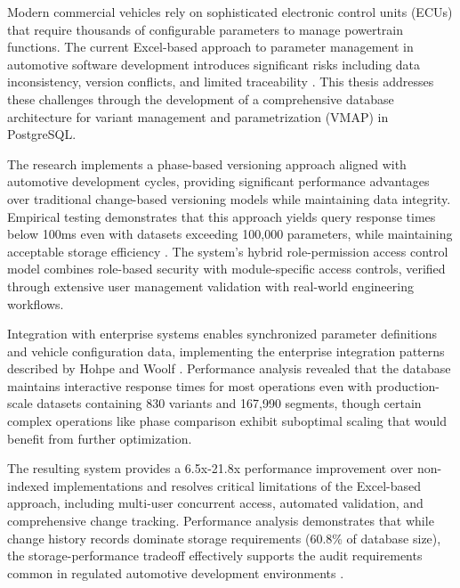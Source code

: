 Modern commercial vehicles rely on sophisticated electronic control units (ECUs) that require thousands of configurable parameters to manage powertrain functions. The current Excel-based approach to parameter management in automotive software development introduces significant risks including data inconsistency, version conflicts, and limited traceability \cite{trovao2024evolution}. This thesis addresses these challenges through the development of a comprehensive database architecture for variant management and parametrization (VMAP) in PostgreSQL. 
	
The research implements a phase-based versioning approach aligned with automotive development cycles, providing significant performance advantages over traditional change-based versioning models while maintaining data integrity. Empirical testing demonstrates that this approach yields query response times below 100ms even with datasets exceeding 100,000 parameters, while maintaining acceptable storage efficiency \cite{bhattacherjee2015principles}. The system's hybrid role-permission access control model combines role-based security with module-specific access controls, verified through extensive user management validation with real-world engineering workflows.
	
Integration with enterprise systems enables synchronized parameter definitions and vehicle configuration data, implementing the enterprise integration patterns described by Hohpe and Woolf \cite{hohpe2002enterprise}. Performance analysis revealed that the database maintains interactive response times for most operations even with production-scale datasets containing 830 variants and 167,990 segments, though certain complex operations like phase comparison exhibit suboptimal scaling that would benefit from further optimization.
	
The resulting system provides a 6.5x-21.8x performance improvement over non-indexed implementations and resolves critical limitations of the Excel-based approach, including multi-user concurrent access, automated validation, and comprehensive change tracking. Performance analysis demonstrates that while change history records dominate storage requirements (60.8\% of database size), the storage-performance tradeoff effectively supports the audit requirements common in regulated automotive development environments \cite{staron2021automotive}.












\newpage
\makeatletter
	\if@twoside%
   		\cleardoublepage
   		
	\else%
	\fi%
\makeatother